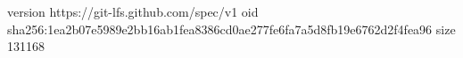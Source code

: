 version https://git-lfs.github.com/spec/v1
oid sha256:1ea2b07e5989e2bb16ab1fea8386cd0ae277fe6fa7a5d8fb19e6762d2f4fea96
size 131168
